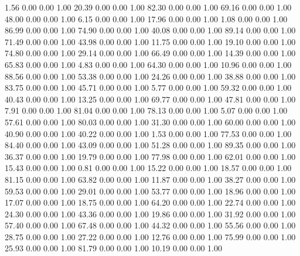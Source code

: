     1.56   0.00   0.00   1.00
   20.39   0.00   0.00   1.00
   82.30   0.00   0.00   1.00
   69.16   0.00   0.00   1.00
   48.00   0.00   0.00   1.00
    6.15   0.00   0.00   1.00
   17.96   0.00   0.00   1.00
    1.08   0.00   0.00   1.00
   86.99   0.00   0.00   1.00
   74.90   0.00   0.00   1.00
   40.08   0.00   0.00   1.00
   89.14   0.00   0.00   1.00
   71.49   0.00   0.00   1.00
   43.98   0.00   0.00   1.00
   11.75   0.00   0.00   1.00
   19.10   0.00   0.00   1.00
   74.80   0.00   0.00   1.00
   29.14   0.00   0.00   1.00
   66.49   0.00   0.00   1.00
   14.39   0.00   0.00   1.00
   65.83   0.00   0.00   1.00
    4.83   0.00   0.00   1.00
   64.30   0.00   0.00   1.00
   10.96   0.00   0.00   1.00
   88.56   0.00   0.00   1.00
   53.38   0.00   0.00   1.00
   24.26   0.00   0.00   1.00
   38.88   0.00   0.00   1.00
   83.75   0.00   0.00   1.00
   45.71   0.00   0.00   1.00
    5.77   0.00   0.00   1.00
   59.32   0.00   0.00   1.00
   40.43   0.00   0.00   1.00
   13.25   0.00   0.00   1.00
   69.77   0.00   0.00   1.00
   47.81   0.00   0.00   1.00
    7.91   0.00   0.00   1.00
   81.04   0.00   0.00   1.00
   78.13   0.00   0.00   1.00
    5.07   0.00   0.00   1.00
   57.61   0.00   0.00   1.00
   80.03   0.00   0.00   1.00
   31.30   0.00   0.00   1.00
   60.00   0.00   0.00   1.00
   40.90   0.00   0.00   1.00
   40.22   0.00   0.00   1.00
    1.53   0.00   0.00   1.00
   77.53   0.00   0.00   1.00
   84.40   0.00   0.00   1.00
   43.09   0.00   0.00   1.00
   51.28   0.00   0.00   1.00
   89.35   0.00   0.00   1.00
   36.37   0.00   0.00   1.00
   19.79   0.00   0.00   1.00
   77.98   0.00   0.00   1.00
   62.01   0.00   0.00   1.00
   15.43   0.00   0.00   1.00
    0.81   0.00   0.00   1.00
   15.22   0.00   0.00   1.00
   18.57   0.00   0.00   1.00
   81.15   0.00   0.00   1.00
   63.82   0.00   0.00   1.00
   11.87   0.00   0.00   1.00
   38.27   0.00   0.00   1.00
   59.53   0.00   0.00   1.00
   29.01   0.00   0.00   1.00
   53.77   0.00   0.00   1.00
   18.96   0.00   0.00   1.00
   17.07   0.00   0.00   1.00
   18.75   0.00   0.00   1.00
   64.20   0.00   0.00   1.00
   22.74   0.00   0.00   1.00
   24.30   0.00   0.00   1.00
   43.36   0.00   0.00   1.00
   19.86   0.00   0.00   1.00
   31.92   0.00   0.00   1.00
   57.40   0.00   0.00   1.00
   67.48   0.00   0.00   1.00
   44.32   0.00   0.00   1.00
   55.56   0.00   0.00   1.00
   28.75   0.00   0.00   1.00
   27.22   0.00   0.00   1.00
   12.76   0.00   0.00   1.00
   75.99   0.00   0.00   1.00
   25.93   0.00   0.00   1.00
   81.79   0.00   0.00   1.00
   10.19   0.00   0.00   1.00
